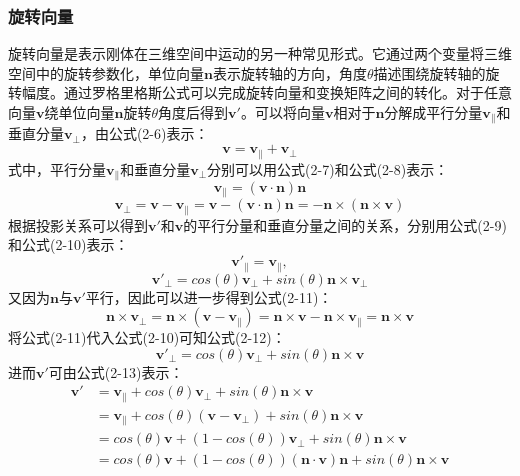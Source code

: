     \subsubsection{旋转向量}
    旋转向量是表示刚体在三维空间中运动的另一种常见形式。它通过两个变量将三维空间中的旋转参数化，单位向量$\mathbf{n}$表示旋转轴的方向，角度$\theta$描述围绕旋转轴的旋转幅度。通过罗格里格斯公式可以完成旋转向量和变换矩阵之间的转化。对于任意向量$\mathbf{v}$绕单位向量$\mathbf{n}$旋转$\theta$角度后得到$\mathbf{v'}$。可以将向量$\mathbf{v}$相对于$\mathbf{n}$分解成平行分量$\mathbf{v_\parallel}$和垂直分量$\mathbf{v_\perp}$，由公式(2-6)表示：
    \begin{equation}
        \mathbf{
        v = v_\parallel + v_\perp
        }
    \end{equation}
    式中，平行分量$\mathbf{v_\parallel}$和垂直分量$\mathbf{v_\perp}$分别可以用公式(2-7)和公式(2-8)表示：
    \begin{equation}
        \mathbf{
        v_\parallel = (v \cdot n)n
        }
    \end{equation}
    \begin{equation}
        \mathbf{
        v_\perp = v - v_\parallel = v - (v \cdot n)n = -n\times(n\times v)
        }
    \end{equation}
    根据投影关系可以得到$\mathbf{v'}$和$\mathbf{v}$的平行分量和垂直分量之间的关系，分别用公式(2-9)和公式(2-10)表示：
    \begin{equation}
        \mathbf{v'_\parallel} = \mathbf{v_\parallel},
    \end{equation}
    \begin{equation}
        \mathbf{v'_\perp}=cos(\theta) \mathbf{v_\perp} + sin(\theta)\mathbf{n}\times \mathbf{v_\perp}
    \end{equation}
    又因为$\mathbf{n}$与$\mathbf{v'}$平行，因此可以进一步得到公式(2-11)：
    \begin{equation}
        \mathbf{
        n\times v_\perp = n\times(v-v_\parallel)= n\times v - n\times v_\parallel = n\times v
        }
    \end{equation}
    将公式(2-11)代入公式(2-10)可知公式(2-12)：
    \begin{equation}
        \mathbf{v'_\perp}=cos(\theta) \mathbf{v_\perp} + sin(\theta)\mathbf{n}\times \mathbf{v}
    \end{equation}
    进而$\mathbf{v'}$可由公式(2-13)表示：
    \begin{equation}
        \begin{aligned}
        \mathbf{v'}
    &    =\mathbf{v_\parallel} + cos(\theta)\mathbf{v_\perp} + sin(\theta)\mathbf{n}\times \mathbf{v}\\
    &    =\mathbf{v_\parallel} + cos(\theta)\mathbf{(v-v_\perp)} + sin(\theta)\mathbf{n\times v} \\
    &    =cos(\theta)\mathbf{v} + (1-cos(\theta))\mathbf{v_\perp} + sin(\theta)\mathbf{n\times v}\\
    &    =cos(\theta)\mathbf{v} + (1-cos(\theta))\mathbf{(n\cdot v)n} + sin(\theta)\mathbf{n\times v}
        \end{aligned}
    \end{equation}
